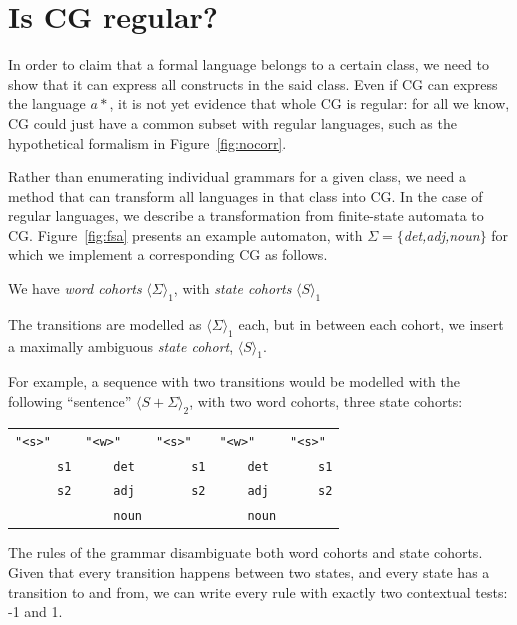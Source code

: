 \documentclass[11pt]{article}
\def\t#1{\texttt{#1}}
\begin{document}
\section{Is CG regular?}

In order to claim that a formal language belongs to a certain class, 
we need to show that it can express all constructs in the said class. 
Even if CG can express the language $a*$, it is not yet evidence 
that whole CG is regular: for all we know, CG could just have a common subset 
with regular languages, such as the hypothetical formalism in Figure~\ref{fig:nocorr}.

Rather than enumerating individual grammars for a given class, we need a method 
that can transform all languages in that class into CG. In the case of regular
languages, we describe a transformation from finite-state automata to CG.
Figure~\ref{fig:fsa} presents an example automaton, with $\Sigma = \{$\emph{det,adj,noun}$\}$ for which we implement a corresponding 
CG as follows.

We have \emph{word cohorts}
$\langle \Sigma \rangle_1$, with \emph{state cohorts} $\langle S \rangle_1$

The transitions are modelled as $\langle \Sigma \rangle_1$ each, but in between each
cohort, we insert a maximally ambiguous \emph{state cohort}, $\langle S \rangle_1$.


For example, a sequence with two transitions would be modelled with the following 
``sentence'' $\langle S+\Sigma \rangle_2$, with two word cohorts, three state cohorts:

\begin{table}[h]
\centering
\begin{tabular}{lllll}
      \t{"<s>"} &  \t{"<w>"}   &      \t{"<s>"} &     \t{"<w>"} &     \t{"<s>"} \\
 ~~~~~~\t{s1}   & ~~~~\t{det}  &  ~~~~\t{ s1}   &  ~~~~\t{det}  &  ~~~~\t{s1}   \\
 ~~~~~~\t{s2}   & ~~~~\t{adj}  &  ~~~~\t{ s2}   &  ~~~~\t{adj}  &  ~~~~\t{s2}    \\
 ~~~~~~         & ~~~~\t{noun} &                &  ~~~~\t{noun} &  
\end{tabular}
\end{table}

The rules of the grammar disambiguate both word cohorts and state cohorts. 
Given that every transition happens between two states, and every state 
has a transition to and from, we can write every rule with exactly
two contextual tests: -1 and 1. 
\end{document}
